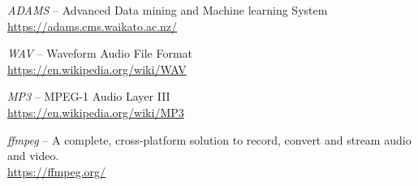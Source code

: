 
\begin{thebibliography}{999}

		\textit{ADAMS} -- Advanced Data mining and Machine learning System \\
		\url{https://adams.cms.waikato.ac.nz/}{}
		
		\textit{WAV} -- Waveform Audio File Format \\
		\url{https://en.wikipedia.org/wiki/WAV}{}
		
		\textit{MP3} -- MPEG-1 Audio Layer III \\
		\url{https://en.wikipedia.org/wiki/MP3}{}

		\textit{ffmpeg} -- A complete, cross-platform solution to record,
		convert and stream audio and video.  \\
		\url{https://ffmpeg.org/}{}

\end{thebibliography}
